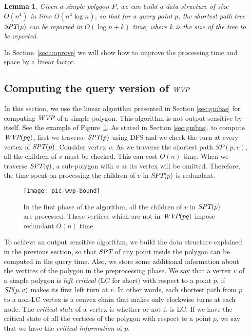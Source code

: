 \documentclass[5p]{elsarticle}
\newtheorem{lemma}[theorem]{Lemma}
\def\WVP{\mbox{\it{WVP}}}
\def\SPT{\mbox{\it{SPT}}}
\def\SP{\mbox{\it{SP}}}
\def\P{\mbox{${P}$}}
\begin{document}
\begin{lemma}
Given a simple polygon $\P$, we can build a data structure of size $O(n^4)$ 
in time $O(n^4 \log n)$, so that for a query point $p$, the 
shortest path tree $\SPT(p)$ can be reported in $O(\log n + k)$ time, where $k$ is 
the size of the tree to be reported.
\end{lemma}

In Section~\ref{sec:improve} we will show how to improve
the processing time and space by a linear factor.


\subsection{Computing the query version of $\WVP$} \label{sec:wvp}
In this section, we use the linear algorithm presented in Section \ref{sec:guibas} for 
computing $\WVP$ of a simple polygon. This algorithm is not output sensitive by itself.
See the example of Figure~\ref{g1}. As stated in Section \ref{sec:guibas}, to compute $\WVP(pq)$,
first we traverse $\SPT(p)$ using DFS and we check the turn at every vertex of $\SPT(p)$.
Consider vertex $v$. As we traverse the shortest path $SP(p, v)$, 
all the children of $v$ must be checked. This can cost $O(n)$ time.
When we traverse $\SPT(q)$, a sub-polygon with $v$ as its vertex will be omitted. 
Therefore, the time spent on processing the children of $v$ in $\SPT(p)$ is redundant.


\begin{figure}[h]
  \centering
  \texttt{[image: pic-wvp-bound]} 
  \caption{In the first phase of the algorithm, all the
  children of $v$ in $\SPT(p)$ are processed. These vertices which are not 
  in $\WVP(pq)$ impose redundant $O(n)$ time.} 
  \label{g1}
\end{figure}




To achieve an output sensitive algorithm, 
we build the data structure explained in the previous 
section, so that $\SPT$ of any point inside the polygon can be computed in the query time.
Also, we store some additional information about the
vertices of the polygon in the preprocessing phase.
We say that a vertex $v$ of a simple polygon is {\em left critical} (LC for short) with respect to
a point $p$, if $\SP(p,v)$ makes its first left turn at $v$. In other words, 
each shortest path from $p$ to a non-LC vertex is a convex chain that 
makes only clockwise turns at each node. 
The {\em critical state} of a vertex is whether or not it is LC. 
If we have the critical state of all the vertices of the polygon with respect to a 
point $p$, we say that we have the {\em critical information} of $p$.
\end{document}

